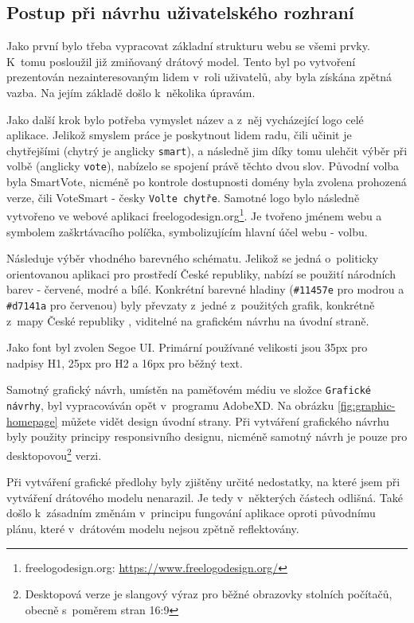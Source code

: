 \subsection{Postup při návrhu uživatelského rozhraní}
Jako první bylo třeba vypracovat základní strukturu webu se všemi prvky. K~tomu posloužil již zmiňovaný drátový model. Tento byl po vytvoření prezentován nezainteresovaným lidem v~roli uživatelů, aby byla získána zpětná vazba. Na jejím základě došlo k~několika úpravám.
\par Jako další krok bylo potřeba vymyslet název a z~něj vycházející logo celé aplikace. Jelikož smyslem práce je poskytnout lidem radu, čili učinit je chytřejšími (chytrý je anglicky \texttt{smart}), a následně jim díky tomu ulehčit výběr při volbě (anglicky \texttt{vote}), nabízelo se spojení právě těchto dvou slov. Původní volba byla SmartVote, nicméně po kontrole dostupnosti domény byla zvolena prohozená verze, čili VoteSmart - česky \texttt{Volte chytře}. Samotné logo bylo následně vytvořeno ve webové aplikaci freelogodesign.org\footnote{freelogodesign.org: \url{https://www.freelogodesign.org/}}. Je tvořeno jménem webu a symbolem zaškrtávacího políčka, symbolizujícím hlavní účel webu - volbu.
\par Následuje výběr vhodného barevného schématu. Jelikož se jedná o~politicky orientovanou aplikaci pro prostředí České republiky, nabízí se použití národních barev - červené, modré a bílé. Konkrétní barevné hladiny (\texttt{\#11457e} pro modrou a \texttt{\#d7141a} pro červenou) byly převzaty z~jedné z~použitých grafik, konkrétně z~mapy České republiky \cite{grafika-mapa}, viditelné na grafickém návrhu na úvodní straně. 
\par Jako font byl zvolen Segoe UI. Primární používané velikosti jsou 35px pro nadpisy H1, 25px pro H2 a 16px pro běžný text.
\par Samotný grafický návrh, umístěn na paměťovém médiu ve složce \texttt{Grafické návrhy}, byl vypracováván opět v~programu AdobeXD. Na obrázku \ref{fig:graphic-homepage} můžete vidět design úvodní strany. Při vytváření grafického návrhu byly použity principy responsivního designu, nicméně samotný návrh je pouze pro desktopovou\footnote{Desktopová verze je slangový výraz pro běžné obrazovky stolních počítačů, obecně s~poměrem stran 16:9} verzi. 

\par Při vytváření grafické předlohy byly zjištěny určité nedostatky, na které jsem při vytváření drátového modelu nenarazil. Je tedy v~některých částech odlišná. Také došlo k~zásadním změnám v~principu fungování aplikace oproti původnímu plánu, které v~drátovém modelu nejsou zpětně reflektovány. 


